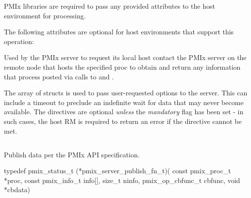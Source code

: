 \reqattrstart
\ac{PMIx} libraries are required to pass any provided attributes to the host environment for processing.
\reqattrend

\optattrstart
The following attributes are optional for host environments that support this operation:


\optattrend

\descr

Used by the \ac{PMIx} server to request its local host contact the \ac{PMIx} server on the remote node that hosts the specified proc to obtain and return any information that process posted via calls to  and .

The array of  structs is used to pass user-requested options to the server.
This can include a timeout to preclude an indefinite wait for data that may never become available.
The directives are optional \emph{unless} the \emph{mandatory} flag has been set - in such cases, the host \ac{RM} is required to return an error if the directive cannot be met.


\subsection{}

\summary

Publish data per the PMIx API specification.

\format

\cspecificstart
\begin{codepar}
typedef pmix_status_t (*pmix_server_publish_fn_t)(
                             const pmix_proc_t *proc,
                             const pmix_info_t info[],
                             size_t ninfo,
                             pmix_op_cbfunc_t cbfunc,
                             void *cbdata)
\end{codepar}
\cspecificend

\begin{arglist}
\end{arglist}


